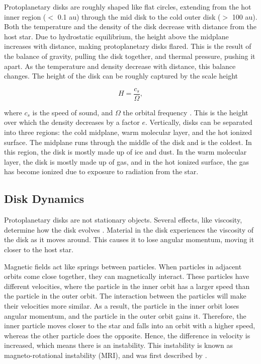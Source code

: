 \documentclass[oneside, single, authoryear, semicolon, 12pt]{lion-msc}
\newcommand{\4}{$_4$}
\newcommand{\3}{$_3$}
\newcommand{\2}{$_2$}
\begin{document}
Protoplanetary disks are roughly shaped like flat circles, extending from the hot inner region ($<$ 0.1 au) through the mid disk to the cold outer disk ($>$ 100 au). Both the temperature and the density of the disk decrease with distance from the host star. Due to hydrostatic equilibrium, the height above the midplane increases with distance, making protoplanetary disks flared. This is the result of the balance of gravity, pulling the disk together, and thermal pressure, pushing it apart. As the temperature and density decrease with distance, this balance changes. The height of the disk can be roughly captured by the scale height

\begin{equation}
    H = \frac{c_s}{\Omega},
\end{equation}

where $c_s$ is the speed of sound, and $\Omega$ the orbital frequency \citep{chap1}. This is the height over which the density decreases by a factor $e$. 
Vertically, disks can be separated into three regions: the cold midplane, warm molecular layer, and the hot ionized surface. The midplane runs through the middle of the disk and is the coldest. In this region, the disk is mostly made up of ice and dust. In the warm molecular layer, the disk is mostly made up of gas, and in the hot ionized surface, the gas has become ionized due to exposure to radiation from the star.

\subsection{Disk Dynamics}
Protoplanetary disks are not stationary objects. Several effects, like viscosity, determine how the disk evolves \citep{chap1}. Material in the disk experiences the viscosity of the disk as it moves around. This causes it to lose angular momentum, moving it closer to the host star.

Magnetic fields act like springs between particles. When particles in adjacent orbits come close together, they can magnetically interact. These particles have different velocities, where the particle in the inner orbit has a larger speed than the particle in the outer orbit. The interaction between the particles will make their velocities more similar. As a result, the particle in the inner orbit loses angular momentum, and the particle in the outer orbit gains it. Therefore, the inner particle moves closer to the star and falls into an orbit with a higher speed, whereas the other particle does the opposite. Hence, the difference in velocity is increased, which means there is an instability. This instability is known as magneto-rotational instability (MRI), and was first described by \cite{RevModPhys.70.1}. 
\end{document}
